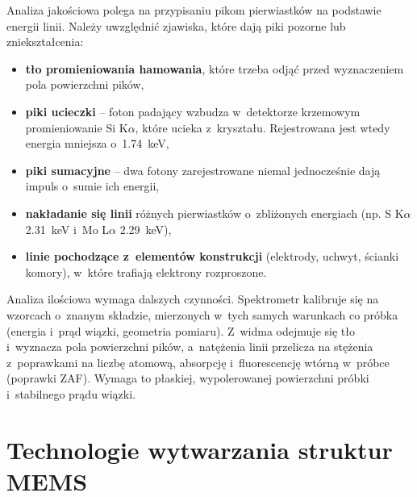 Analiza jakościowa polega na przypisaniu pikom pierwiastków na
podstawie energii linii. Należy uwzględnić zjawiska, które dają piki
pozorne lub zniekształcenia:
\begin{itemize}
  \item \textbf{tło promieniowania hamowania}, które trzeba odjąć przed
        wyznaczeniem pola powierzchni pików,
  \item \textbf{piki ucieczki} -- foton padający wzbudza w~detektorze
        krzemowym promieniowanie Si K$\alpha$, które ucieka z~kryształu.
        Rejestrowana jest wtedy energia mniejsza o~\SI{1.74}{\kilo\electronvolt},
  \item \textbf{piki sumacyjne} -- dwa fotony zarejestrowane niemal
        jednocześnie dają impuls o~sumie ich energii,
  \item \textbf{nakładanie się linii} różnych pierwiastków o~zbliżonych
        energiach (np. S K$\alpha$ \SI{2.31}{\kilo\electronvolt}
        i~Mo L$\alpha$ \SI{2.29}{\kilo\electronvolt}),
  \item \textbf{linie pochodzące z~elementów konstrukcji} (elektrody,
        uchwyt, ścianki komory), w~które trafiają elektrony rozproszone.
\end{itemize}

\begin{zmiana}
Analiza ilościowa wymaga dalszych czynności. Spektrometr kalibruje się
na wzorcach o~znanym składzie, mierzonych w~tych samych warunkach co
próbka (energia i~prąd wiązki, geometria pomiaru). Z~widma odejmuje się
tło i~wyznacza pola powierzchni pików, a~natężenia linii przelicza na
stężenia z~poprawkami na liczbę atomową, absorpcję i~fluorescencję
wtórną w~próbce (poprawki ZAF). Wymaga to płaskiej, wypolerowanej
powierzchni próbki i~stabilnego prądu wiązki.
\end{zmiana}

\section{Technologie wytwarzania struktur MEMS}
\label{sec:technologia}

